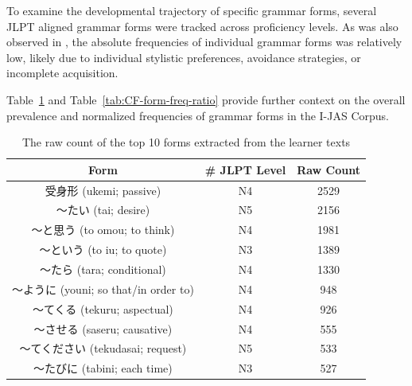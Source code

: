 



To examine the developmental trajectory of specific grammar forms, several JLPT aligned grammar forms were tracked
across proficiency levels.  As was also observed in \citet{akef2025}, the absolute frequencies of individual grammar
forms was relatively low, likely due to individual stylistic preferences, avoidance strategies, or incomplete
acquisition.

Table~\ref{tab:CF-form-freq} and Table~\ref{tab:CF-form-freq-ratio} provide further context on the overall
prevalence and normalized frequencies of grammar forms in the I-JAS Corpus.


\begin{table}[h!]
\centering
\begin{tabular}{ccc}
\hline \textbf{Form} & \textbf{\# JLPT Level} & \textbf{Raw Count} \\ \hline
受身形 (ukemi; passive)                & N4 & 2529 \\
〜たい (tai; desire)                  & N5 & 2156 \\
〜と思う (to omou; to think)          & N4 & 1981 \\
〜という (to iu; to quote)            & N3 & 1389 \\
〜たら (tara; conditional)            & N4 & 1330 \\
〜ように (youni; so that/in order to) & N4 & 948 \\
〜てくる (tekuru; aspectual)          & N4 & 926 \\
〜させる (saseru; causative)          & N4 & 555 \\
〜てください (tekudasai; request)     & N5 & 533 \\
〜たびに (tabini; each time)          & N3 & 527 \\
\hline
\end{tabular}
\caption[Raw frequency of Top 10 Forms extracted from the I-JAS Corpus]{The raw count of the top 10 forms extracted
from the learner texts}
\label{tab:CF-form-freq}
\end{table}

